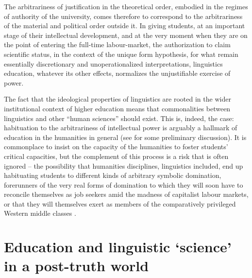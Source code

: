\documentclass[output=paper]{langscibook}
\begin{document}
The arbitrariness of justification in the theoretical order, embodied in the regimes of authority of the university, comes therefore to correspond to the arbitrariness of the material and political order outside it. In giving students, at an important stage of their intellectual development, and at the very moment when they are on the point of entering the full-time labour-market, the authorization to claim scientific status, in the context of the unique form hypothesis, for what remain essentially discretionary and unoperationalized interpretations, linguistics education, whatever its other effects, normalizes the unjustifiable exercise of power.

The fact that the ideological properties of linguistics are rooted in the wider institutional context of higher education means that commonalities between linguistics and other ``human sciences'' should exist. This is, indeed, the case: habituation to the arbitrariness of intellectual power is arguably a hallmark of education in the humanities in general (see \citealt{Riemer2016} for some preliminary discussion). It is commonplace to insist on the capacity of the humanities to foster students' critical capacities, but the complement of this process is a risk that is often ignored -- the possibility that humanities disciplines, linguistics included, end up habituating students to different kinds of arbitrary symbolic domination, forerunners of the very real forms of domination to which they will soon have to reconcile themselves as job seekers amid the madness of capitalist labour markets, or that they will themselves exert as members of the comparatively privileged Western middle classes \citep[see][]{Pinsker2015}.

\section{Education and linguistic ‘science’ in a post-truth world}
\label{sec:riemer:education}
\end{document}
